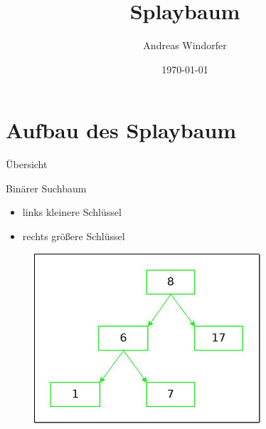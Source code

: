 \documentclass[11pt]{beamer}
\begin{document}
	\author{Andreas Windorfer}
	\title{Splaybaum}
	\date{\today}
	\begin{frame}{}
		\titlepage

	\end{frame}
	
	\section{Aufbau des Splaybaum}
		\begin{frame} {Übersicht}
			\tableofcontents[currentsection]   
			
		\end{frame}
	
		\begin{frame} {Binärer Suchbaum}
			\begin{multicols}{2}
			\begin{itemize}
				\item links kleinere Schlüssel
				\item rechts größere Schlüssel
			\end{itemize}
			\end{multicols}
			\begin{figure}[h]
				\centering
				\includegraphics[width=0.75\textwidth]{"bilder/suchbaumIO"}
			\end{figure}    
		\end{frame}
		
\end{document}
